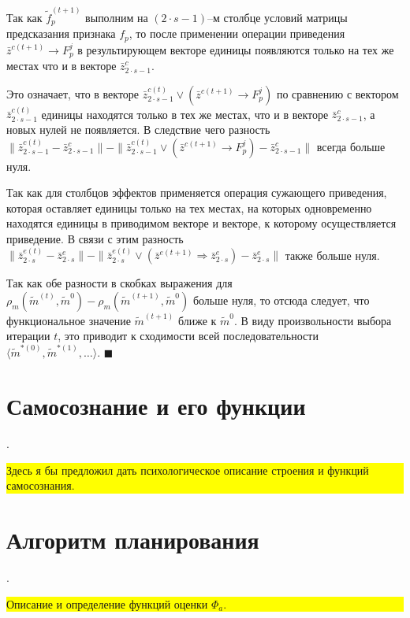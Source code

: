 \documentclass[a4paper, 12pt]{article}
\theoremstyle{plain}
\newenvironment{Proof}%
	{\par\noindent{\bf Доказательство.}}%
	{\hfill$\scriptstyle\blacksquare$}
\begin{document}
\begin{Proof}
		Так как $\tilde f_p^{(t+1)}$ выполним на $(2\cdot s-1)$–м столбце условий матрицы предсказания признака $f_p$, то после применении операции приведения $\bar z^{c(t+1)}\rightarrow F_p^j$ в результирующем векторе единицы появляются только на тех же местах что и в векторе $\bar z_{2\cdot s-1}^c$. 
		
		Это означает, что в векторе $\bar z_{2\cdot s-1}^{c(t)}\vee(\bar z^{c(t+1)}\rightarrow F_p^j)$ по сравнению с вектором $\bar z_{2\cdot s-1}^{c(t)}$  единицы находятся только в тех же местах, что и в векторе $\bar z_{2\cdot s-1}^c$, а новых нулей не появляется. В следствие чего разность $\|\bar z_{2\cdot s-1}^{c(t)}-\bar z_{2\cdot s-1}^c\|-\|\bar z_{2\cdot s-1}^{c(t)}\vee(\bar z^{c(t+1)}\rightarrow F_p^j)-\bar z_{2\cdot s-1}^c\|$ всегда больше нуля.
		
		Так как для столбцов эффектов применяется операция сужающего приведения, которая оставляет единицы только на тех местах, на которых одновременно находятся единицы в приводимом векторе и векторе, к которому осуществляется приведение. В связи с этим разность $\|\bar z_{2\cdot s}^{e(t)}-\bar z_{2\cdot s}^e\|-\|\bar z_{2\cdot s}^{e(t)}\vee(\bar z^{e(t+1)}\Rightarrow\bar z_{2\cdot s}^e)-\bar z_{2\cdot s}^e\|$ также больше нуля.
		
		Так как обе разности в скобках выражения для $\rho_m(\tilde m^{(t)},\tilde m^0)-\rho_m(\tilde m^{(t+1)},\tilde m^0)$ больше нуля, то отсюда следует, что функциональное значение $\tilde m^{(t+1)}$ ближе к $\tilde m^0$. В виду произвольности выбора итерации $t$, это приводит к сходимости всей последовательности $\langle\tilde m^{*(0)},\tilde m^{*(1)},\dots\rangle$. 
	\end{Proof}
	
	\section{Самосознание и его функции} .
	
	\noindent\colorbox{yellow}{
		\parbox{\dimexpr\linewidth-2\fboxsep}{Здесь я бы предложил дать психологическое описание строения и функций самосознания.}
	}
	
	\section{Алгоритм планирования}	.

	\noindent\colorbox{yellow}{
		\parbox{\dimexpr\linewidth-2\fboxsep}{Описание и определение функций оценки $\Phi_a$.}
	}
\end{document}
